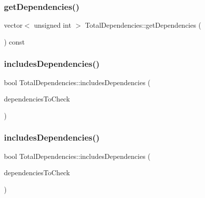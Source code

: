 \subsubsection{\texorpdfstring{get\+Dependencies()}{getDependencies()}}
{\footnotesize\ttfamily vector$<$ unsigned int $>$ Total\+Dependencies\+::get\+Dependencies (\begin{DoxyParamCaption}{ }\end{DoxyParamCaption}) const}

\mbox{\label{classTotalDependencies_a66aebb100cbce0faf5551fd74b0de0d8}} 
\subsubsection{\texorpdfstring{includes\+Dependencies()}{includesDependencies()}\hspace{0.1cm}{\footnotesize\ttfamily [1/2]}}
{\footnotesize\ttfamily bool Total\+Dependencies\+::includes\+Dependencies (\begin{DoxyParamCaption}\item[{const \hyperlink{classTotalDependencies}{Total\+Dependencies} \&}]{dependencies\+To\+Check }\end{DoxyParamCaption})}

\mbox{\label{classTotalDependencies_aed1c3ce4bee031ca9341d8ce4a179ef0}} 
\subsubsection{\texorpdfstring{includes\+Dependencies()}{includesDependencies()}\hspace{0.1cm}{\footnotesize\ttfamily [2/2]}}
{\footnotesize\ttfamily bool Total\+Dependencies\+::includes\+Dependencies (\begin{DoxyParamCaption}\item[{const vector$<$ \hyperlink{structures_8h_a83a1d9a070efa5341da84cfd8e28d3e5}{id\+Msg} $>$ \&}]{dependencies\+To\+Check }\end{DoxyParamCaption})}

